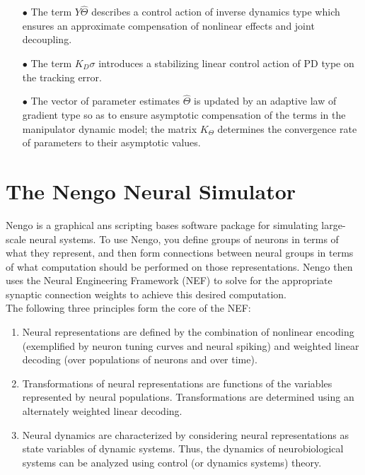 \begin{itemize}
\item[$\bullet$] The term $Y\hat{\Theta}$ describes a control action of inverse dynamics type which ensures an approximate compensation of nonlinear effects and joint decoupling.
\item[$\bullet$] The term $K_D\sigma$ introduces a stabilizing linear control action of PD type on the tracking error.
\item[$\bullet$] The vector of parameter estimates $\hat{\Theta}$ is updated by an adaptive law of gradient type so as to ensure asymptotic compensation of the terms in the manipulator dynamic model; the matrix $K_\Theta$ determines the convergence rate of parameters to their asymptotic values.
\end{itemize}

\section{The Nengo Neural Simulator}
Nengo\citep{brain} is a graphical ans scripting bases software package for simulating large-scale neural systems. To use Nengo, you define groups of neurons in terms of what they represent, and then form connections between neural groups in terms of what computation should be performed on those representations. Nengo then uses the Neural Engineering Framework (NEF) to solve for the appropriate synaptic connection weights to achieve this desired computation.\\

The following three principles form the core of the NEF:

\begin{enumerate}
\item Neural representations are defined by the combination of nonlinear
encoding (exemplified by neuron tuning curves and neural spiking) and
weighted linear decoding (over populations of neurons and over time).
\item Transformations of neural representations are functions of the variables
represented by neural populations. Transformations are determined
using an alternately weighted linear decoding.
\item Neural dynamics are characterized by considering neural
representations as state variables of dynamic systems. Thus, the
dynamics of neurobiological systems can be analyzed using control (or
dynamics systems) theory.
\end{enumerate}


